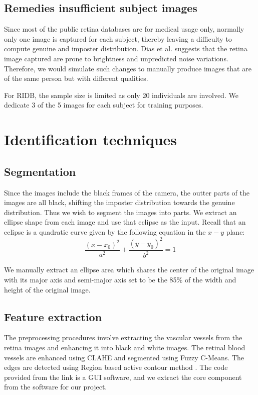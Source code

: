 \documentclass[a4paper,11pt]{article}
\theoremstyle{plain} %
\begin{document}
\subsection{Remedies insufficient subject images}
Since most of the public retina databases are for medical usage only, normally only one image is captured for each subject, thereby leaving a difficulty to compute genuine and imposter distribution. Dias et al. \cite{dias2014retinal} suggests that the retina image captured are prone to brightness and unpredicted noise variations. Therefore, we would simulate such changes to manually produce images that are of the same person but with different qualities. 

For RIDB, the sample size is limited as only 20 individuals are involved. We dedicate 3 of the 5 images for each subject for training purposes.


\section{Identification techniques}

\subsection{Segmentation}
Since the images include the black frames of the camera, the outter parts of the images are all black, shifting the imposter distribution towards the genuine distribution. Thus we wish to segment the images into parts. We extract an ellipse shape from each image and use that eclipse as the input. Recall that an eclipse is a quadratic curve given by the following equation in the $x-y$ plane:
$$\frac{(x-x_0)^2}{a^2} + \frac{(y-y_0)^2}{b^2} = 1$$

We manually extract an ellipse area which shares the center of the original image with its major axis and semi-major axis set to be the 85\% of the width and height of the original image. 	 

\subsection{Feature extraction}
The preprocessing procedures involve extracting the vascular vessels from the retina images and enhancing it into black and white images. The retinal blood vessels are enhanced using CLAHE and segmented using Fuzzy C-Means. The edges are detected using Region based active contour method \cite{segmentation2017web}. The code provided from the link is a GUI software, and we extract the core component from the software for our project.
\end{document}
